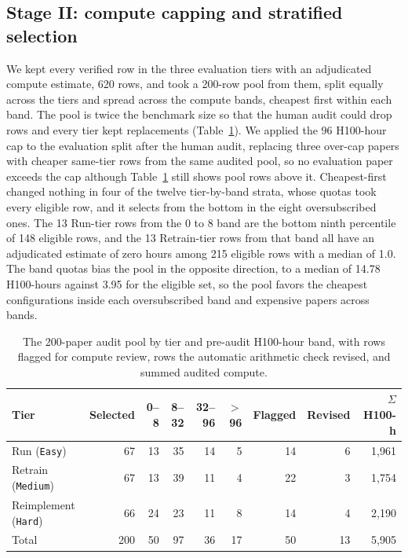 \subsection{Stage II: compute capping and stratified selection}
\label{app:selection}

We kept every verified row in the three evaluation tiers with an adjudicated
compute estimate, 620 rows, and took a 200-row pool from them, split equally
across the tiers and spread across the compute bands, cheapest first within
each band. The pool is twice the benchmark size so that the human audit could
drop rows and every tier kept replacements (Table~\ref{tab:audit-pool}). We
applied the 96 H100-hour cap to the evaluation split after the human audit,
replacing three over-cap papers with cheaper same-tier rows from the same
audited pool, so no evaluation paper exceeds the cap although
Table~\ref{tab:audit-pool} still shows pool rows above it. Cheapest-first
changed nothing in four of the twelve tier-by-band strata, whose quotas took
every eligible row, and it selects from the bottom in the eight oversubscribed
ones. The 13 Run-tier rows from the 0 to 8 band are the bottom ninth percentile
of 148 eligible rows, and the 13 Retrain-tier rows from that band all have an
adjudicated estimate of zero hours among 215 eligible rows with a median of
1.0. The band quotas bias the pool in the opposite direction, to a median of
14.78 H100-hours against 3.95 for the eligible set, so the pool favors the
cheapest configurations inside each oversubscribed band and expensive papers
across bands.

\begin{table}[!ht]
\centering
\small
\begin{tabular}{@{}lrrrrrrrr@{}}
\toprule
Tier & Selected & 0--8 & 8--32 & 32--96 & $>$96 & Flagged & Revised & $\Sigma$
H100-h \\
\midrule
Run (\texttt{Easy})          & 67 & 13 & 35 & 14 & 5 & 14 & 6 & 1,961 \\
Retrain (\texttt{Medium})    & 67 & 13 & 39 & 11 & 4 & 22 & 3 & 1,754 \\
Reimplement (\texttt{Hard})  & 66 & 24 & 23 & 11 & 8 & 14 & 4 & 2,190 \\
\midrule
Total & 200 & 50 & 97 & 36 & 17 & 50 & 13 & 5,905 \\
\bottomrule
\end{tabular}
\caption{The 200-paper audit pool by tier and pre-audit H100-hour band, with
rows flagged for compute review, rows the automatic arithmetic check revised,
and summed audited compute.}
\label{tab:audit-pool}
\end{table}

